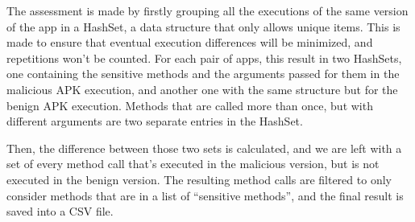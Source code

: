 The assessment is made by firstly grouping all the executions of the same version of the app in a HashSet, a data structure that only allows unique items. This is made to ensure that eventual execution differences will be minimized, and repetitions won't be counted. For each pair of apps, this result in two HashSets, one containing the sensitive methods and the arguments passed for them in the malicious APK execution, and another one with the same structure but for the benign APK execution. Methods that are called more than once, but with different arguments are two separate entries in the HashSet.

Then, the difference between those two sets is calculated, and we are left with a set of every method call that's executed in the malicious version, but is not executed in the benign version. The resulting method calls are filtered to only consider methods that are in a list of ``sensitive methods'', and the final result is saved into a CSV file. 